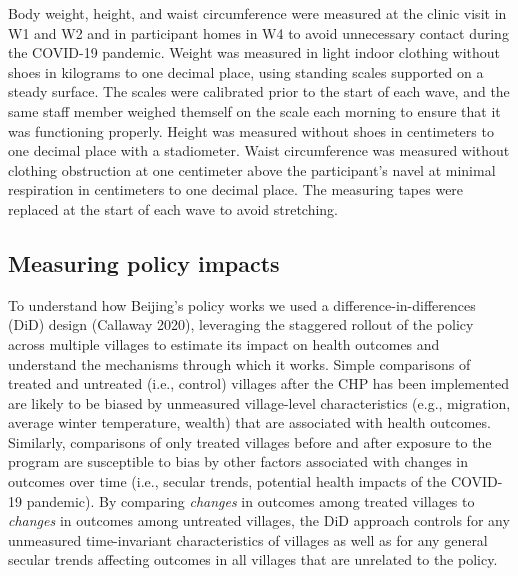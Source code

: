 \documentclass[
  letterpaper,
  DIV=11,
  numbers=noendperiod]{scrartcl}
\begin{document}
Body weight, height, and waist circumference were measured at the clinic
visit in W1 and W2 and in participant homes in W4 to avoid unnecessary
contact during the COVID-19 pandemic. Weight was measured in light
indoor clothing without shoes in kilograms to one decimal place, using
standing scales supported on a steady surface. The scales were
calibrated prior to the start of each wave, and the same staff member
weighed themself on the scale each morning to ensure that it was
functioning properly. Height was measured without shoes in centimeters
to one decimal place with a stadiometer. Waist circumference was
measured without clothing obstruction at one centimeter above the
participant's navel at minimal respiration in centimeters to one decimal
place. The measuring tapes were replaced at the start of each wave to
avoid stretching.

\subsection{Measuring policy impacts}\label{measuring-policy-impacts}

To understand how Beijing's policy works we used a
difference-in-differences (DiD) design (Callaway 2020), leveraging the
staggered rollout of the policy across multiple villages to estimate its
impact on health outcomes and understand the mechanisms through which it
works. Simple comparisons of treated and untreated (i.e., control)
villages after the CHP has been implemented are likely to be biased by
unmeasured village-level characteristics (e.g., migration, average
winter temperature, wealth) that are associated with health outcomes.
Similarly, comparisons of only treated villages before and after
exposure to the program are susceptible to bias by other factors
associated with changes in outcomes over time (i.e., secular trends,
potential health impacts of the COVID-19 pandemic). By comparing
\emph{changes} in outcomes among treated villages to \emph{changes} in
outcomes among untreated villages, the DiD approach controls for any
unmeasured time-invariant characteristics of villages as well as for any
general secular trends affecting outcomes in all villages that are
unrelated to the policy.
\end{document}
